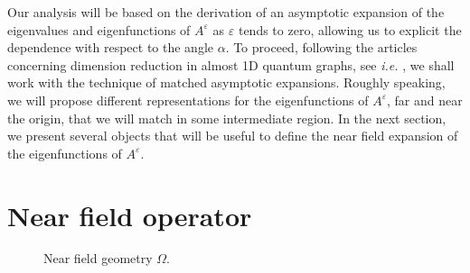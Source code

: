 \documentclass[11pt,a4paper]{article}
\newcommand{\eps}{\varepsilon}
\newcommand{\Om}{\Omega}
\begin{document}
\noindent Our analysis will be based on the derivation of an asymptotic expansion of the eigenvalues and eigenfunctions of $A^\eps$ as $\eps$ tends to zero, allowing us to explicit the dependence with respect to the angle $\alpha$. To proceed, following the articles concerning dimension reduction in almost 1D quantum graphs, see \textit{i.e.} \cite{Grie08,Naza14,ChNa23}, we shall work with the technique of matched asymptotic expansions. Roughly speaking, we will propose different representations for the eigenfunctions of $A^\eps$, far and near the origin, that we will match in some intermediate region. In the next section, we present several objects that will be useful to define the near field expansion of the eigenfunctions of $A^\eps$. 


\section{Near field operator}\label{SectionNFPb}

\begin{figure}[!ht]
\centering
{}
\caption{Near field geometry $\Om$.}\label{GeomInnerField}
\end{figure}
\end{document}
